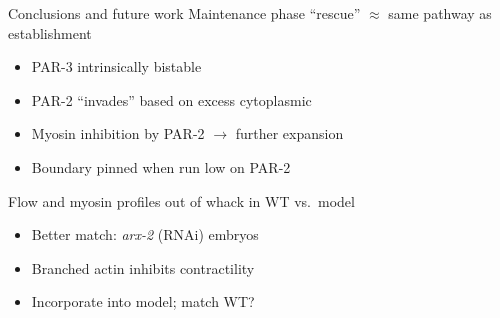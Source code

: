 \documentclass{beamer}
\newcommand{\6}[1]{#1_{\text{6}}}
\newcommand{\3}[1]{#1_{\text{3}}}
\begin{document}
\begin{frame}{Conclusions and future work}
Maintenance phase ``rescue'' $\approx$ same pathway as establishment
\begin{itemize}
\item PAR-3 intrinsically bistable
\item PAR-2 ``invades'' based on excess cytoplasmic
\item Myosin inhibition by PAR-2 $\rightarrow$ further expansion
\item Boundary pinned when run low on PAR-2
\end{itemize}
Flow and myosin profiles out of whack in WT vs.\ model
\begin{itemize}
\item Better match: \emph{arx-2} (RNAi) embryos 
\item Branched actin inhibits contractility
\item Incorporate into model; match WT?
\end{itemize} 
\end{frame}
\end{document}

